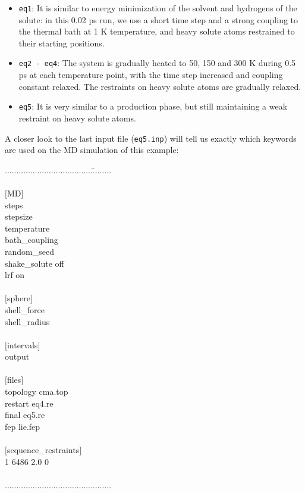 \documentclass[a4paper,12pt]{article}
\begin{document}
        \begin {itemize}
        \item \texttt{eq1}: It is similar to energy minimization of the solvent and hydrogens of the solute: in this 0.02 ps run, we use a short time step and a strong coupling to the thermal bath at 1 K temperature, and heavy solute atoms restrained to their starting positions.
        \item \texttt{eq2 - eq4}: The system is gradually heated to 50, 150 and 300 K during 0.5 ps at each temperature point, with the time step increased and coupling constant relaxed. The restraints on heavy solute atoms are gradually relaxed.
        \item \texttt{eq5}: It is very similar to a production phase, but still maintaining a weak restraint on heavy solute atoms.
        \end {itemize}

A closer look to the last input file (\texttt{eq5.inp}) will tell
us exactly which keywords are used on the MD simulation of this
example:
%
%
\begin{tabbing}
......................................\=........\\
\\
$[$MD$]$ \\
steps \\
stepsize\\
temperature\\
bath\_coupling\\
random\_seed\\
shake\_solute\>              off\\
lrf\>                       on\\
\\
$[$sphere$]$ \\
shell\_force\\
shell\_radius\\
\\
$[$intervals$]$ \\
output\\
\\
$[$files$]$ \\
topology\>     cma.top\\
restart\>      eq4.re\\
final\>        eq5.re\\
fep\>          lie.fep\\
\\
$[$sequence\_restraints$]$\\
1 6486 2.0 0\\
\\
..............................................\\
\end{tabbing}
\end{document}
